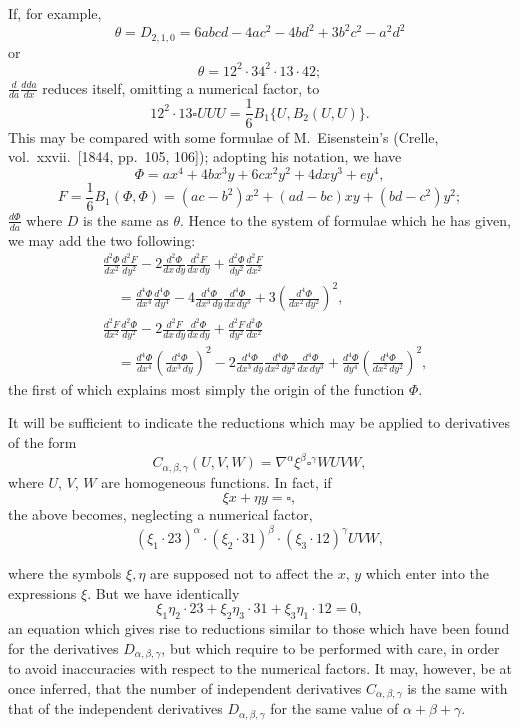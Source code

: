 \documentclass[11pt,a4paper]{book}
\begin{document}
\newpage
\setcounter{page}{111}

If, for example,
\[
\theta = D_{2,1,0} = 6abcd - 4ac^2 - 4bd^2 + 3b^2c^2 - a^2d^2
\]
or
\[
\theta = 12^2 \cdot 34^2 \cdot 13 \cdot 42;
\]
$\frac{d}{da} \frac{dda}{dx}$ reduces itself, omitting a numerical factor, to
\[
12^2 \cdot 13 \square UUU = \frac{1}{6} B_1\{U, B_2(U, U)\}.
\]
This may be compared with some formulae of M.~Eisenstein's (Crelle, vol.~xxvii.\ [1844, pp.~105, 106]); adopting his notation, we have
\[
\Phi = ax^4 + 4bx^3y + 6cx^2y^2 + 4dxy^3 + ey^4,
\]
\[
F = \frac{1}{6} B_1(\Phi, \Phi) = (ac-b^2)x^2 + (ad-bc)xy + (bd-c^2)y^2;
\]
$\frac{d\Phi}{da}$ where $D$ is the same as $\theta$. Hence to the system of formulae which he has given,
we may add the two following:
\begin{align*}
&\frac{d^2\Phi}{dx^2} \frac{d^2F}{dy^2} - 2 \frac{d^2\Phi}{dx\,dy} \frac{d^2F}{dx\,dy} + \frac{d^2\Phi}{dy^2} \frac{d^2F}{dx^2}\\
&\quad = \frac{d^4\Phi}{dx^4} \frac{d^4\Phi}{dy^4} - 4 \frac{d^4\Phi}{dx^3\,dy} \frac{d^4\Phi}{dx\,dy^3}
+ 3 \left(\frac{d^4\Phi}{dx^2\,dy^2}\right)^2,\\
&\frac{d^2F}{dx^2} \frac{d^2\Phi}{dy^2} - 2 \frac{d^2F}{dx\,dy} \frac{d^2\Phi}{dx\,dy} + \frac{d^2F}{dy^2} \frac{d^2\Phi}{dx^2}\\
&\quad = \frac{d^4\Phi}{dx^4} \left(\frac{d^4\Phi}{dx^3\,dy}\right)^2
- 2 \frac{d^4\Phi}{dx^3\,dy} \frac{d^4\Phi}{dx^2\,dy^2} \frac{d^4\Phi}{dx\,dy^3}
+ \frac{d^4\Phi}{dy^4} \left(\frac{d^4\Phi}{dx^2\,dy^2}\right)^2,
\end{align*}
the first of which explains most simply the origin of the function $\Phi$.

It will be sufficient to indicate the reductions which may be applied to derivatives
of the form
\[
C_{\alpha,\beta,\gamma}(U, V, W) = \nabla^\alpha \xi^\beta \square^\gamma WUVW,
\]
where $U$, $V$, $W$ are homogeneous functions. In fact, if
\[
\xi x + \eta y = \square,
\]
the above becomes, neglecting a numerical factor,
\[
(\xi_1 \cdot 23)^\alpha \cdot (\xi_2 \cdot 31)^\beta \cdot (\xi_3 \cdot 12)^\gamma UVW,
\]

\newpage
\setcounter{page}{112}

where the symbols $\xi, \eta$ are supposed not to affect the $x$, $y$ which enter into the
expressions $\xi$. But we have identically
\[
\xi_1 \eta_2 \cdot 23 + \xi_2 \eta_3 \cdot 31 + \xi_3 \eta_1 \cdot 12 = 0,
\]
an equation which gives rise to reductions similar to those which have been found for
the derivatives $D_{\alpha,\beta,\gamma}$, but which require to be performed with care, in order to avoid
inaccuracies with respect to the numerical factors. It may, however, be at once
inferred, that the number of independent derivatives $C_{\alpha,\beta,\gamma}$ is the same with that of
the independent derivatives $D_{\alpha,\beta,\gamma}$ for the same value of $\alpha + \beta + \gamma$.
\end{document}
